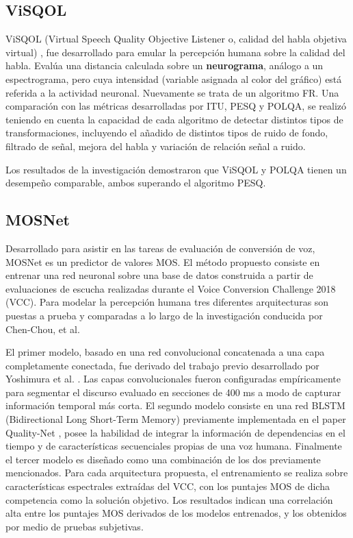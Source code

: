 \subsection{ViSQOL}
ViSQOL (Virtual Speech Quality Objective Listener o, calidad del habla objetiva virtual) \cite{visqol}, fue desarrollado para emular la percepción humana sobre la calidad del habla. Evalúa una distancia calculada sobre un \textbf{neurograma}, análogo a un espectrograma, pero cuya intensidad (variable asignada al color del gráfico) está referida a la actividad neuronal. Nuevamente se trata de un algoritmo FR. Una comparación con las métricas desarrolladas por ITU, PESQ y POLQA, se realizó teniendo en cuenta la capacidad de cada algoritmo de detectar distintos tipos de transformaciones, incluyendo el añadido de distintos tipos de ruido de fondo, filtrado de señal, mejora del habla y variación de relación señal a ruido.

Los resultados de la investigación demostraron que ViSQOL y POLQA tienen un desempeño comparable, ambos superando el algoritmo PESQ.


\subsection{MOSNet}
Desarrollado para asistir en las tareas de evaluación de conversión de voz, MOSNet\cite{mosnet} es un predictor de valores MOS. El método propuesto consiste en entrenar una red neuronal sobre una base de datos construida a partir de evaluaciones de escucha realizadas durante el Voice Conversion Challenge 2018 (VCC). Para modelar la percepción humana tres diferentes arquitecturas son puestas a prueba y comparadas a lo largo de la investigación conducida por Chen-Chou, et al. 

El primer modelo, basado en una red convolucional concatenada a una capa completamente conectada, fue derivado del trabajo previo desarrollado por Yoshimura et al. \cite{yoshimura}. Las capas convolucionales fueron configuradas empíricamente para segmentar el discurso evaluado en secciones de 400 ms a modo de capturar información temporal más corta. El segundo modelo consiste en una red BLSTM (Bidirectional Long Short-Term Memory) previamente implementada en el paper Quality-Net \cite{qualitynet}, posee la habilidad de integrar la información de dependencias en el tiempo y de características secuenciales propias de una voz humana. Finalmente el tercer modelo es diseñado como una combinación de los dos previamente mencionados. 
Para cada arquitectura propuesta, el entrenamiento se realiza sobre características espectrales extraídas del VCC, con los puntajes MOS de dicha competencia como la solución objetivo. 
Los resultados indican una correlación alta entre los puntajes MOS derivados de los modelos entrenados, y los obtenidos por medio de pruebas subjetivas.

